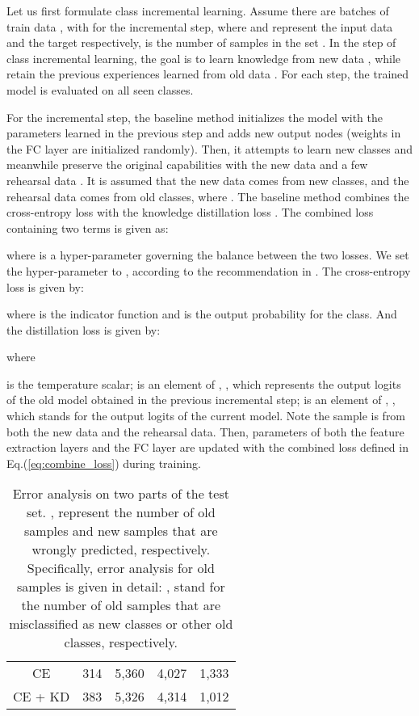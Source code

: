 \documentclass[10pt,twocolumn,letterpaper]{article}
\begin{document}
Let us first formulate class incremental learning. Assume there are  batches of train data , with  for the  incremental step, where  and  represent the input data and the target respectively,  is the number of samples in the set . In the  step of class incremental learning, the goal is to learn knowledge from new data , while retain the previous experiences learned from old data . For each step, the trained model is evaluated on all seen classes.

For the  incremental step, the baseline method initializes the model with the parameters learned in the previous step and adds new output nodes (weights in the FC layer are initialized randomly). Then, it attempts to learn new classes and meanwhile preserve the original capabilities with the new data  and a few rehearsal data . It is assumed that the new data  comes from  new classes, and the rehearsal data  comes from  old classes, where . The baseline method combines the cross-entropy loss  with the knowledge distillation loss . The combined loss containing two terms is given as:

where  is a hyper-parameter governing the balance between the two losses. We set the hyper-parameter  to , according to the recommendation in \cite{wu2019large}. The cross-entropy loss is given by:

where  is the indicator function and  is the output probability for the  class. And the distillation loss is given by:

where 

 is the temperature scalar;  is an element of , , which represents the output logits of the old model obtained in the previous incremental step;  is an element of ,
, which stands for the output logits of the current model. Note the sample  is from both the new data and the rehearsal data. Then, parameters of both the feature extraction layers and the FC layer are updated with the combined loss defined in Eq.(\ref{eq:combine_loss}) during training. 

\begin{table}[t]
\centering
\caption{Error analysis on two parts of the test set. ,  represent the number of old samples and new samples that are wrongly predicted, respectively. Specifically, error analysis for old samples is given in detail: ,  stand for the number of old samples that are misclassified as new classes or other old classes, respectively.}

\begin{tabular}{c|c|c|c|c}
  \toprule
        &  &  &  &  \\
  \midrule
  \midrule
  CE    & 314   & 5,360 & 4,027 & 1,333 \\
  CE + KD & 383   & 5,326 & 4,314 & 1,012 \\
  \bottomrule
  \end{tabular}\label{tab:fivesteps_results}\end{table}
\end{document}
